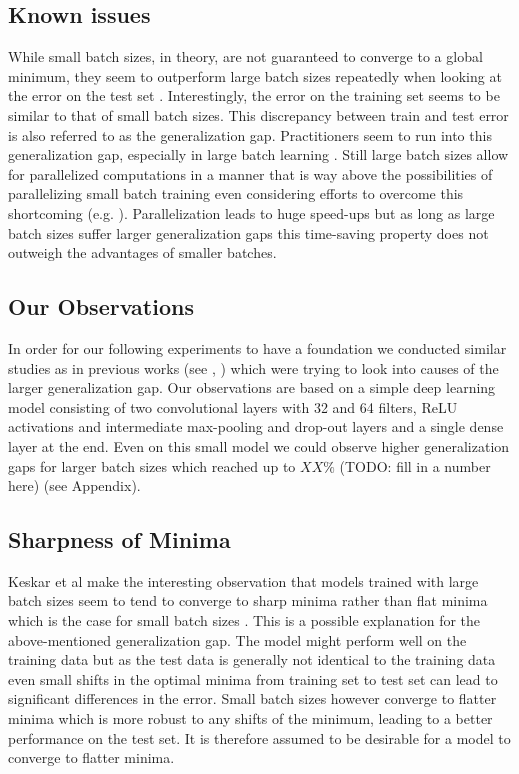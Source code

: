 \documentclass[10pt,conference,compsocconf]{IEEEtran}
\begin{document}
\subsection{Known issues}
\label{subsec:known-issues}

While small batch sizes, in theory, are not guaranteed to converge to a global minimum, they seem to outperform large batch sizes repeatedly when looking at the error on the test set \cite{keskar2017largebatch}. Interestingly, the error on the training set seems to be similar to that of small batch sizes. This discrepancy between train and test error is also referred to as the generalization gap. Practitioners seem to run into this generalization gap, especially in large batch learning \cite{lecunEfficientBackProp2012}. Still large batch sizes allow for parallelized computations in a manner that is way above the possibilities of parallelizing small batch training even considering efforts to overcome this shortcoming (e.g. \cite{dasDistributedDeepLearning2016}). Parallelization leads to huge speed-ups but as long as large batch sizes suffer larger generalization gaps this time-saving property does not outweigh the advantages of smaller batches.

\subsection{Our Observations}
\label{subsec:our-observations}

In order for our following experiments to have a foundation we conducted similar studies as in previous works (see \cite{changEffectBatchSize2020}, \cite{shenEffectBatchSize2018}) which were trying to look into causes of the larger generalization gap. Our observations are based on a simple deep learning model consisting of two convolutional layers with 32 and 64 filters, ReLU activations and intermediate max-pooling and drop-out layers and a single dense layer at the end. Even on this small model we could observe higher generalization gaps for larger batch sizes which reached up to $XX\%$ (TODO: fill in a number here) (see Appendix).

\subsection{Sharpness of Minima}
\label{subsec:sharpness}

Keskar et al make the interesting observation that models trained with large batch sizes seem to tend to converge to sharp minima rather than flat minima which is the case for small batch sizes \cite{keskar2017largebatch}. This is a possible explanation for the above-mentioned generalization gap. The model might perform well on the training data but as the test data is generally not identical to the training data even small shifts in the optimal minima from training set to test set can lead to significant differences in the error. Small batch sizes however converge to flatter minima which is more robust to any shifts of the minimum, leading to a better performance on the test set. It is therefore assumed to be desirable for a model to converge to flatter minima.
\end{document}
